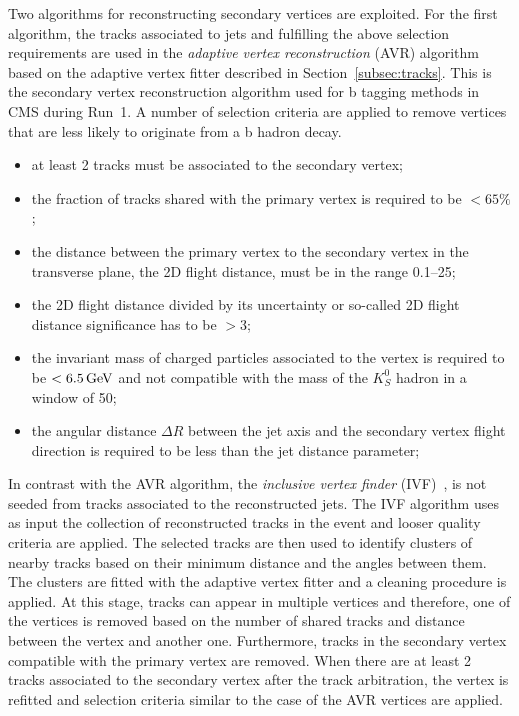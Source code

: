Two algorithms for reconstructing secondary vertices are exploited. For the first algorithm, the tracks associated to jets and fulfilling the above selection requirements are used in the \textit{adaptive vertex reconstruction} (AVR) algorithm~\cite{Waltenberger:1166320} based on the adaptive vertex fitter described in Section~\ref{subsec:tracks}. This is the secondary vertex reconstruction algorithm used for b tagging methods in CMS during Run~1. A number of selection criteria are applied to remove vertices that are less likely to originate from a b hadron decay. 

\begin{itemize}
\item at least 2 tracks must be associated to the secondary vertex;
\item the fraction of tracks shared with the primary vertex is required to be $< 65\%$;
\item the distance between the primary vertex to the secondary vertex in the transverse plane, the 2D flight distance, must be in the range 0.1--25\mm;
\item the 2D flight distance divided by its uncertainty or so-called 2D flight distance significance has to be $> 3$;
\item the invariant mass of charged particles associated to the vertex is required to be $< 6.5\,\text{Ge\hspace{-.08em}V}$ and not compatible with the mass of the $K^0_S$ hadron in a window of 50\MeV;
\item the angular distance $\Delta R$ between the jet axis and the secondary vertex flight direction is required to be less than the jet distance parameter;
\end{itemize}

In contrast with the AVR algorithm, the \textit{inclusive vertex finder} (IVF)~\cite{Khachatryan:2011wq}, is not seeded from tracks associated to the reconstructed jets. The IVF algorithm uses as input the collection of reconstructed tracks in the event and looser quality criteria are applied. The selected tracks are then used to identify clusters of nearby tracks based on their minimum distance and the angles between them. The clusters are fitted with the adaptive vertex fitter and a cleaning procedure is applied. At this stage, tracks can appear in multiple vertices and therefore, one of the vertices is removed based on the number of shared tracks and distance between the vertex and another one. Furthermore, tracks in the secondary vertex compatible with the primary vertex are removed. When there are at least 2 tracks associated to the secondary vertex after the track arbitration, the vertex is refitted and selection criteria similar to the case of the AVR vertices are applied.


